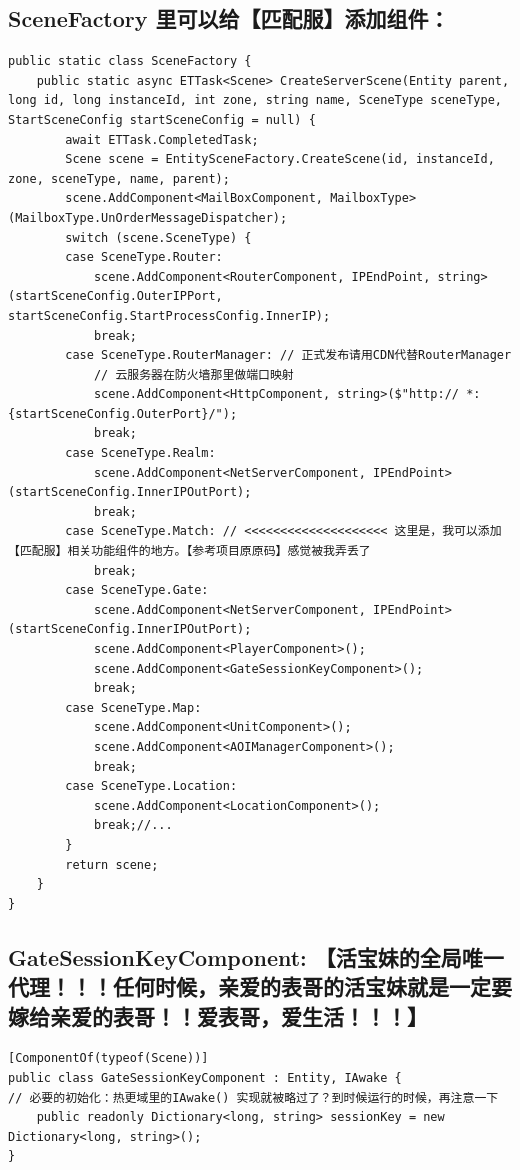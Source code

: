 \documentclass[9pt, b5paper]{article}
\begin{document}
\subsection{SceneFactory 里可以给【匹配服】添加组件：}
\label{sec-7-23}
\begin{verbatim}
public static class SceneFactory {
    public static async ETTask<Scene> CreateServerScene(Entity parent, long id, long instanceId, int zone, string name, SceneType sceneType, StartSceneConfig startSceneConfig = null) {
        await ETTask.CompletedTask;
        Scene scene = EntitySceneFactory.CreateScene(id, instanceId, zone, sceneType, name, parent);
        scene.AddComponent<MailBoxComponent, MailboxType>(MailboxType.UnOrderMessageDispatcher);
        switch (scene.SceneType) {
        case SceneType.Router:
            scene.AddComponent<RouterComponent, IPEndPoint, string>(startSceneConfig.OuterIPPort, startSceneConfig.StartProcessConfig.InnerIP);
            break;
        case SceneType.RouterManager: // 正式发布请用CDN代替RouterManager
            // 云服务器在防火墙那里做端口映射
            scene.AddComponent<HttpComponent, string>($"http:// *:{startSceneConfig.OuterPort}/");
            break;
        case SceneType.Realm:
            scene.AddComponent<NetServerComponent, IPEndPoint>(startSceneConfig.InnerIPOutPort);
            break;
        case SceneType.Match: // <<<<<<<<<<<<<<<<<<<< 这里是，我可以添加【匹配服】相关功能组件的地方。【参考项目原原码】感觉被我弄丢了
            break;
        case SceneType.Gate:
            scene.AddComponent<NetServerComponent, IPEndPoint>(startSceneConfig.InnerIPOutPort);
            scene.AddComponent<PlayerComponent>();
            scene.AddComponent<GateSessionKeyComponent>();
            break;
        case SceneType.Map:
            scene.AddComponent<UnitComponent>();
            scene.AddComponent<AOIManagerComponent>();
            break;
        case SceneType.Location:
            scene.AddComponent<LocationComponent>();
            break;//...
        }
        return scene;
    }
}
\end{verbatim}
\subsection{GateSessionKeyComponent: 【活宝妹的全局唯一代理！！！任何时候，亲爱的表哥的活宝妹就是一定要嫁给亲爱的表哥！！爱表哥，爱生活！！！】}
\label{sec-7-24}
\begin{verbatim}
[ComponentOf(typeof(Scene))]
public class GateSessionKeyComponent : Entity, IAwake {
// 必要的初始化：热更域里的IAwake() 实现就被略过了？到时候运行的时候，再注意一下
    public readonly Dictionary<long, string> sessionKey = new Dictionary<long, string>(); 
}
\end{verbatim}
\end{document}
